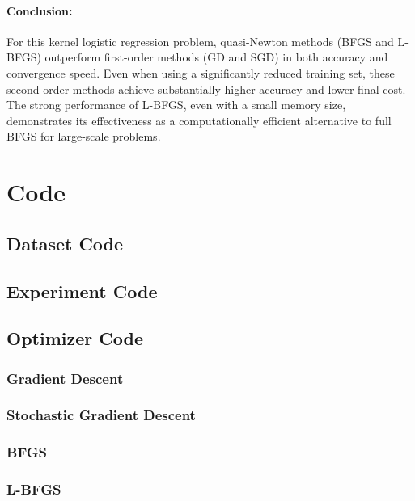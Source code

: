 \documentclass{article}
\begin{document}
\paragraph{Conclusion:}
For this kernel logistic regression problem, quasi-Newton methods (BFGS and L-BFGS) outperform first-order methods (GD and SGD) in both accuracy and convergence speed. Even when using a significantly reduced training set, these second-order methods achieve substantially higher accuracy and lower final cost. The strong performance of L-BFGS, even with a small memory size, demonstrates its effectiveness as a computationally efficient alternative to full BFGS for large-scale problems.

\medskip


\section{Code}
\subsection{Dataset Code}

\subsection{Experiment Code}

\subsection{Optimizer Code}
\subsubsection{Gradient Descent}

\subsubsection{Stochastic Gradient Descent}

\subsubsection{BFGS}

\subsubsection{L-BFGS}

\end{document}
